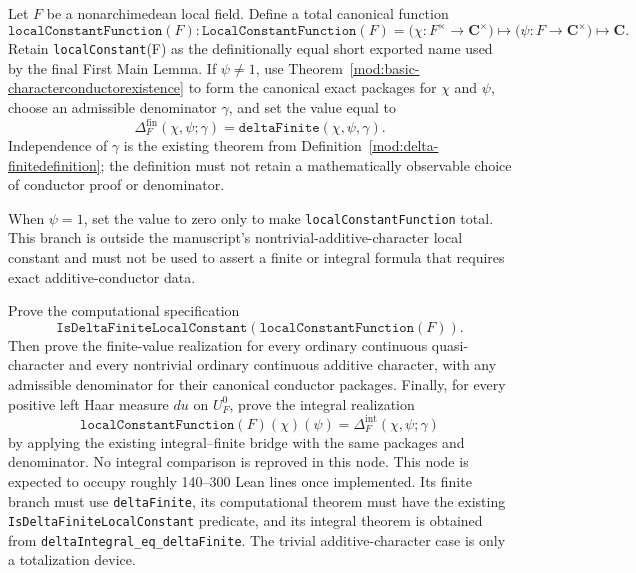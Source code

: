 \begin{definition}
\label{mod:delta-localconstantrealization}
Let $F$ be a nonarchimedean local field.  Define a total canonical function
\[
 \texttt{localConstantFunction}(F):
 \texttt{LocalConstantFunction}(F)
 =\bigl(\chi:F^\times\to\mathbf C^\times\bigr)
  \longmapsto
 \bigl(\psi:F\to\mathbf C^\times\bigr)
  \longmapsto\mathbf C.
\]
Retain \texttt{localConstant}(F) as the definitionally equal short exported
name used by the final First Main Lemma.
If $\psi\ne1$, use Theorem~\ref{mod:basic-characterconductorexistence} to
form the canonical exact packages for $\chi$ and $\psi$, choose an admissible
denominator $\gamma$, and set the value equal to
\[
 \Delta_F^{\mathrm{fin}}(\chi,\psi;\gamma)
 =\texttt{deltaFinite}(\chi,\psi,\gamma).
\]
Independence of $\gamma$ is the existing theorem from
Definition~\ref{mod:delta-finitedefinition}; the definition must not retain a
mathematically observable choice of conductor proof or denominator.

When $\psi=1$, set the value to zero only to make
\texttt{localConstantFunction} total.  This branch is outside the manuscript's
nontrivial-additive-character local constant and must not be used to assert a
finite or integral formula that requires exact additive-conductor data.

Prove the computational specification
\[
 \texttt{IsDeltaFiniteLocalConstant}
   (\texttt{localConstantFunction}(F)).
\]
Then prove the finite-value realization for every ordinary continuous
quasi-character and every nontrivial ordinary continuous additive character,
with any admissible denominator for their canonical conductor packages.
Finally, for every positive left Haar measure $du$ on $U_F^0$, prove the
integral realization
\[
 \texttt{localConstantFunction}(F)(\chi)(\psi)
 =\Delta_F^{\mathrm{int}}(\chi,\psi;\gamma)
\]
by applying the existing integral--finite bridge with the same packages and
denominator.  No integral comparison is reproved in this node.
\leanok
{}
\FormalizationContract
This node is expected to occupy roughly 140--300 Lean lines once implemented.
Its finite branch must use \texttt{deltaFinite}, its computational theorem
must have the existing \texttt{IsDeltaFiniteLocalConstant} predicate, and its
integral theorem is obtained from
\texttt{deltaIntegral\_eq\_deltaFinite}.  The trivial additive-character
case is only a totalization device.
\end{definition}
